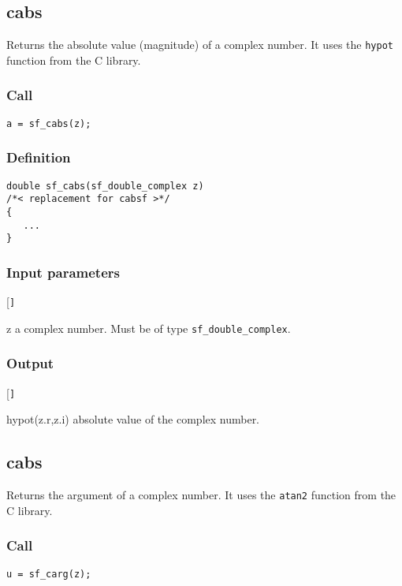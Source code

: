 \subsection{{cabs}}
Returns the absolute value (magnitude) of a complex number. It uses the \texttt{hypot} function from the C library.

\subsubsection*{Call}
\begin{verbatim}a = sf_cabs(z);\end{verbatim}

\subsubsection*{Definition}
\begin{verbatim}
double sf_cabs(sf_double_complex z)
/*< replacement for cabsf >*/
{
   ...
}
\end{verbatim}

\subsubsection*{Input parameters}
\begin{desclist}{\tt }{\quad}[\tt ]
   \setlength\itemsep{0pt}
   \item[z] a complex number. Must be of type \texttt{sf\_double\_complex}.  
\end{desclist}

\subsubsection*{Output}
\begin{desclist}{\tt }{\quad}[\tt ]
   \setlength\itemsep{0pt}
   \item[hypot(z.r,z.i)] absolute value of the complex number. 
\end{desclist}




\subsection{{cabs}}
Returns the argument of a complex number. It uses the \texttt{atan2} function from the C library.

\subsubsection*{Call}
\begin{verbatim}u = sf_carg(z);\end{verbatim}

